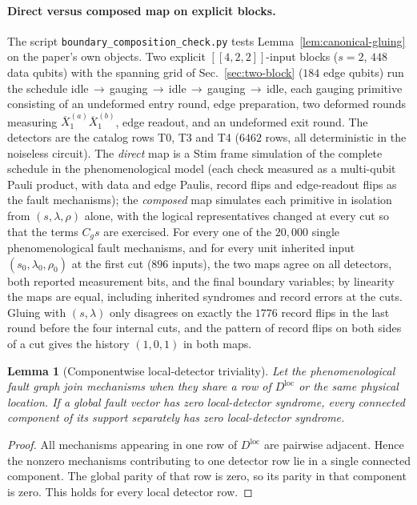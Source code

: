 \documentclass[aps,prx,reprint,superscriptaddress,nofootinbib,floatfix,longbibliography]{revtex4-2}
\newtheorem{lemma}[theorem]{Lemma}
\theoremstyle{definition}
\begin{document}
\paragraph{Direct versus composed map on explicit blocks.}
The script \texttt{boundary\_composition\_check.py} tests
Lemma~\ref{lem:canonical-gluing} on the paper's own objects.  Two explicit
$[[4,2,2]]$-input blocks ($s=2$, $448$ data qubits) with the spanning grid of
Sec.~\ref{sec:two-block} ($184$ edge qubits) run the schedule
idle$\,\to\,$gauging$\,\to\,$idle$\,\to\,$gauging$\,\to\,$idle, each gauging
primitive consisting of an undeformed entry round, edge preparation, two
deformed rounds measuring $\overline X_1^{(a)}\overline X_1^{(b)}$, edge
readout, and an undeformed exit round.  The detectors are the catalog rows
T0, T3 and T4 ($6462$ rows, all deterministic in the noiseless circuit).  The
\emph{direct} map is a Stim frame simulation of the complete schedule in the
phenomenological model (each check measured as a multi-qubit Pauli product,
with data and edge Paulis, record flips and edge-readout flips as the fault
mechanisms);
the \emph{composed} map simulates each primitive in isolation from
$(s,\lambda,\rho)$ alone, with the logical representatives changed at every
cut so that the terms $C_gs$ are exercised.  For every one of the $20{,}000$
single phenomenological fault mechanisms, and for every unit inherited input
$(s_0,\lambda_0,\rho_0)$ at the first cut ($896$ inputs), the two maps agree on
all detectors, both reported measurement bits, and the final boundary
variables; by linearity the maps are equal, including inherited syndromes and
record errors at the cuts.  Gluing with $(s,\lambda)$ only disagrees on
exactly the $1776$ record flips in the last round before the four internal
cuts, and the pattern of record flips on both sides of a cut gives
the history $(1,0,1)$ in both maps.

\begin{lemma}[Componentwise local-detector triviality]
\label{lem:componentwise}
Let the phenomenological fault graph join mechanisms when they share a row of
$D^{\mathrm{loc}}$ or the same physical location.  If a global fault vector has
zero local-detector syndrome, every connected component of its support
separately has zero local-detector syndrome.
\end{lemma}
\begin{proof}
All mechanisms appearing in one row of $D^{\mathrm{loc}}$ are pairwise adjacent.
Hence the nonzero mechanisms contributing to one detector row lie in a single
connected component.  The global parity of that row is zero, so its parity in
that component is zero.  This holds for every local detector row.
\end{proof}
\end{document}
